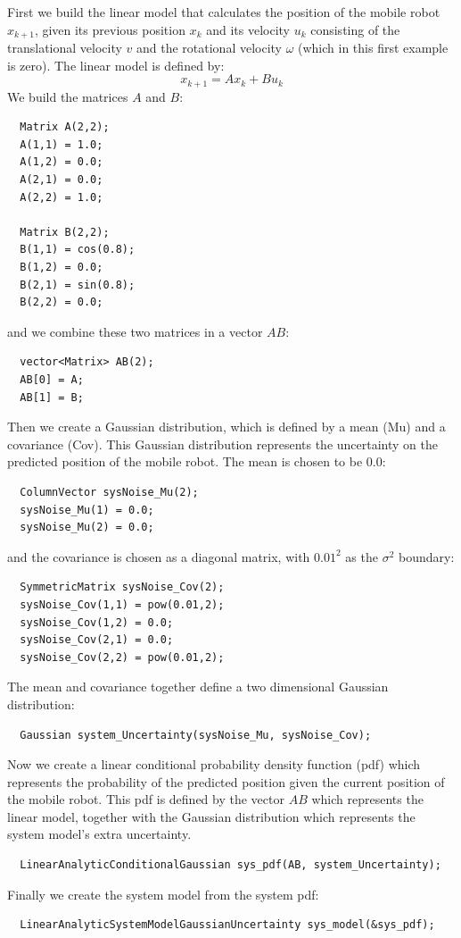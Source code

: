 \documentclass[a4paper,10pt]{report}
\begin{document}
First we build the linear model that calculates the position of the
mobile robot ${x}_{k+1}$, given its previous position ${x}_k$ and its
velocity ${u}_k$ consisting of the translational velocity $v$ and the
rotational velocity $\omega$ (which in this first example is zero).
The linear model is defined by:
\begin{equation}
  {x}_{k+1} = {A} {x}_k +
  {B} {u}_k
\end{equation}
We build the matrices ${A}$ and ${B}$:
\begin{verbatim}
  Matrix A(2,2);
  A(1,1) = 1.0;
  A(1,2) = 0.0;
  A(2,1) = 0.0;
  A(2,2) = 1.0;

  Matrix B(2,2);
  B(1,1) = cos(0.8);
  B(1,2) = 0.0;
  B(2,1) = sin(0.8);
  B(2,2) = 0.0;
\end{verbatim}
and we combine these two matrices in a vector ${AB}$:
\begin{verbatim}
  vector<Matrix> AB(2);
  AB[0] = A;
  AB[1] = B;
\end{verbatim}
Then we create a Gaussian distribution, which is defined by a mean
(Mu) and a covariance (Cov). This Gaussian distribution represents the
uncertainty on the predicted position of the mobile robot. The
mean is chosen to be $0.0$:
\begin{verbatim}
  ColumnVector sysNoise_Mu(2);
  sysNoise_Mu(1) = 0.0;
  sysNoise_Mu(2) = 0.0;
\end{verbatim}
and the covariance is chosen as a diagonal matrix, with $0.01^2$ as the
$\sigma^2$ boundary:
\begin{verbatim}
  SymmetricMatrix sysNoise_Cov(2);
  sysNoise_Cov(1,1) = pow(0.01,2);
  sysNoise_Cov(1,2) = 0.0;
  sysNoise_Cov(2,1) = 0.0;
  sysNoise_Cov(2,2) = pow(0.01,2);
\end{verbatim}
The mean and covariance together define a two dimensional Gaussian
distribution:
\begin{verbatim}
  Gaussian system_Uncertainty(sysNoise_Mu, sysNoise_Cov);
\end{verbatim}
Now we create a linear conditional probability density function (pdf)
which represents the probability of the predicted position given the
current position of the mobile robot. This pdf is defined by the
vector ${AB}$ which represents the linear model, together with the
Gaussian distribution which represents the system model's extra
uncertainty.
\begin{verbatim}
  LinearAnalyticConditionalGaussian sys_pdf(AB, system_Uncertainty);
\end{verbatim}
Finally we create the system model from the system pdf:
\begin{verbatim}
  LinearAnalyticSystemModelGaussianUncertainty sys_model(&sys_pdf);
\end{verbatim}
\end{document}

